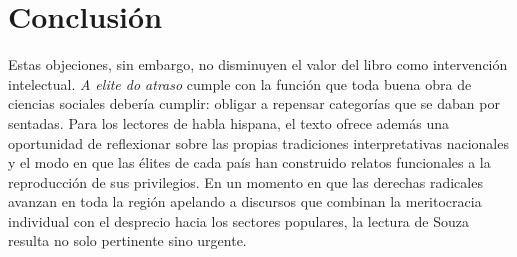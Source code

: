 \documentclass{article}
\begin{document}
\section{Conclusión}
Estas objeciones, sin embargo, no disminuyen el valor del libro como intervención intelectual. \textit{A elite do atraso} cumple con la función que toda buena obra de ciencias sociales debería cumplir: obligar a repensar categorías que se daban por sentadas. Para los lectores de habla hispana, el texto ofrece además una oportunidad de reflexionar sobre las propias tradiciones interpretativas nacionales y el modo en que las élites de cada país han construido relatos funcionales a la reproducción de sus privilegios. En un momento en que las derechas radicales avanzan en toda la región apelando a discursos que combinan la meritocracia individual con el desprecio hacia los sectores populares, la lectura de Souza resulta no solo pertinente sino urgente.
\end{document}

